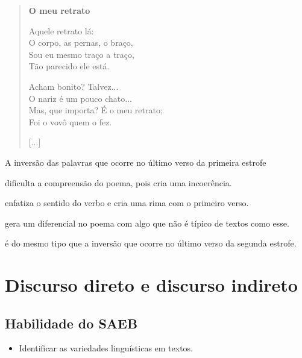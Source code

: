 \begin{myquote}
\begin{verse}
\textbf{O meu retrato}

Aquele retrato lá:\\
O corpo, as pernas, o braço,\\
Sou eu mesmo traço a traço,\\
Tão parecido ele está.

Acham bonito? Talvez...\\
O nariz é um pouco chato...\\
Mas, que importa? É o meu retrato;\\
Foi o vovô quem o fez.

{[}...{]}
\end{verse}


\end{myquote}

A inversão das palavras que ocorre no último verso da primeira estrofe

\begin{escolha}[itemsep=-5pt]
\item dificulta a compreensão do poema, pois cria uma incoerência.

\item enfatiza o sentido do verbo e cria uma rima com o primeiro verso.

\item gera um diferencial no poema com algo que não é típico de textos como esse.

\item é do mesmo tipo que a inversão que ocorre no último verso da segunda estrofe.
\end{escolha}

\chapter{Discurso direto e discurso indireto}

\section*{Habilidade do SAEB}

\begin{itemize}
  \item Identificar as variedades linguísticas em textos.
\end{itemize}

